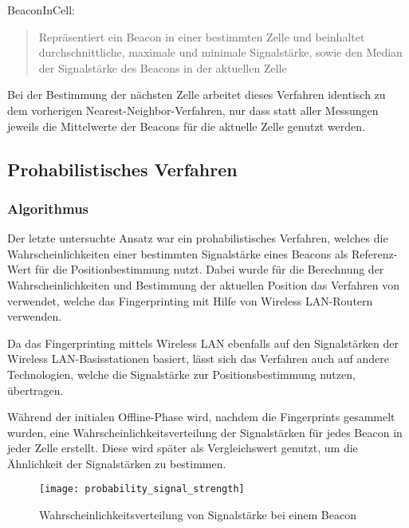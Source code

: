 BeaconInCell:
	\begin{quote}Repräsentiert ein Beacon in einer bestimmten Zelle und beinhaltet durchschnittliche, maximale und minimale Signalstärke, sowie den Median der Signalstärke des Beacons in der aktuellen Zelle\end{quote}

Bei der Bestimmung der nächsten Zelle arbeitet dieses Verfahren identisch zu dem vorherigen Nearest-Neighbor-Verfahren, nur dass statt aller Messungen jeweils die Mittelwerte der Beacons für die aktuelle Zelle genutzt werden. 



\subsection{Prohabilistisches Verfahren}
\label{sec:implementation:fingerprinting:positioning:probability}

\subsubsection{Algorithmus}
\label{sec:implementation:fingerprinting:positioning:probability:algorithm}

Der letzte untersuchte Ansatz war ein prohabilistisches Verfahren, welches die Wahrscheinlichkeiten einer bestimmten Signalstärke eines Beacons als Referenz-Wert für die Positionbestimmung nutzt. Dabei wurde für die Berechnung der Wahrscheinlichkeiten und Bestimmung der aktuellen Position das Verfahren von \citet{wifiFingerprintProbability} verwendet, welche das Fingerprinting mit Hilfe von Wireless LAN-Routern verwenden.

Da das Fingerprinting mittels Wireless LAN ebenfalls auf den Signalstärken der Wireless LAN-Basisstationen basiert, lässt sich das Verfahren auch auf andere Technologien, welche die Signalstärke zur Positionsbestimmung nutzen, übertragen.

Während der initialen Offline-Phase wird, nachdem die Fingerprints gesammelt wurden, eine Wahrscheinlichkeitsverteilung der Signalstärken für jedes Beacon in jeder Zelle erstellt. Diese wird später als Vergleichswert genutzt, um die Ähnlichkeit der Signalstärken zu bestimmen.

\begin{figure}[htb!]
		\centering
	\texttt{[image: probability\_signal\_strength]}
	\caption{Wahrscheinlichkeitsverteilung von Signalstärke bei einem Beacon}
	\label{probability-signal-strength-beacon}
\end{figure}

